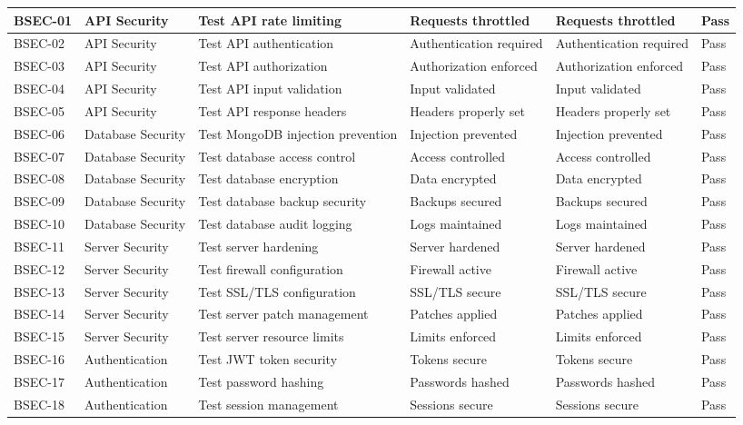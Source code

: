 {\begin{longtable}{|p{1.5cm}|p{2.5cm}|p{3.5cm}|p{2.5cm}|p{2.5cm}|p{1.5cm}|}
BSEC-01 & API Security & Test API rate limiting & Requests throttled & Requests throttled & Pass \\
\hline
BSEC-02 & API Security & Test API authentication & Authentication required & Authentication required & Pass \\
\hline
BSEC-03 & API Security & Test API authorization & Authorization enforced & Authorization enforced & Pass \\
\hline
BSEC-04 & API Security & Test API input validation & Input validated & Input validated & Pass \\
\hline
BSEC-05 & API Security & Test API response headers & Headers properly set & Headers properly set & Pass \\
\hline
BSEC-06 & Database Security & Test MongoDB injection prevention & Injection prevented & Injection prevented & Pass \\
\hline
BSEC-07 & Database Security & Test database access control & Access controlled & Access controlled & Pass \\
\hline
BSEC-08 & Database Security & Test database encryption & Data encrypted & Data encrypted & Pass \\
\hline
BSEC-09 & Database Security & Test database backup security & Backups secured & Backups secured & Pass \\
\hline
BSEC-10 & Database Security & Test database audit logging & Logs maintained & Logs maintained & Pass \\
\hline
BSEC-11 & Server Security & Test server hardening & Server hardened & Server hardened & Pass \\
\hline
BSEC-12 & Server Security & Test firewall configuration & Firewall active & Firewall active & Pass \\
\hline
BSEC-13 & Server Security & Test SSL/TLS configuration & SSL/TLS secure & SSL/TLS secure & Pass \\
\hline
BSEC-14 & Server Security & Test server patch management & Patches applied & Patches applied & Pass \\
\hline
BSEC-15 & Server Security & Test server resource limits & Limits enforced & Limits enforced & Pass \\
\hline
BSEC-16 & Authentication & Test JWT token security & Tokens secure & Tokens secure & Pass \\
\hline
BSEC-17 & Authentication & Test password hashing & Passwords hashed & Passwords hashed & Pass \\
\hline
BSEC-18 & Authentication & Test session management & Sessions secure & Sessions secure & Pass \\

\end{longtable}}
